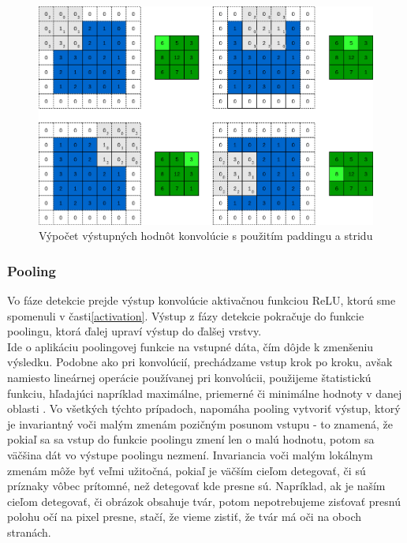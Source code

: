 \begin{figure}[H]
	\centering
	\includegraphics[width=1\linewidth]{img/cnn2}
	\caption{Výpočet výstupných hodnôt konvolúcie s použitím paddingu a stridu }
	\label{fig:cnn2}
\end{figure}

\subsubsection{Pooling}
Vo fáze detekcie prejde výstup konvolúcie aktivačnou funkciou ReLU, ktorú sme spomenuli v časti\ref{activation}. Výstup z fázy detekcie pokračuje do funkcie poolingu, ktorá ďalej upraví výstup do ďalšej vrstvy.\\ 

\indent Ide o aplikáciu poolingovej funkcie na vstupné dáta, čím dôjde k zmenšeniu výsledku.
Podobne ako pri konvolúcií, prechádzame vstup krok po kroku, avšak namiesto lineárnej operácie používanej pri konvolúcii, použijeme štatistickú funkciu, hľadajúci napríklad maximálne, priemerné či minimálne hodnoty v danej oblasti \cite{cs231n}.
Vo všetkých týchto prípadoch, napomáha pooling vytvoriť výstup, ktorý je invariantný voči malým zmenám pozičným posunom vstupu - to znamená, že pokiaľ sa sa vstup do funkcie poolingu zmení len o malú hodnotu, potom sa väčšina dát vo výstupe poolingu nezmení. 
Invariancia voči malým lokálnym zmenám môže byť veľmi užitočná, pokiaľ je väčším cieľom detegovať, či sú príznaky vôbec prítomné, než detegovať kde presne sú\cite{goodfellow2016deep}.
Napríklad, ak je naším cieľom detegovať, či obrázok obsahuje tvár, potom nepotrebujeme zisťovať presnú polohu očí na pixel presne, stačí, že vieme zistiť, že tvár má oči na oboch stranách. \\

